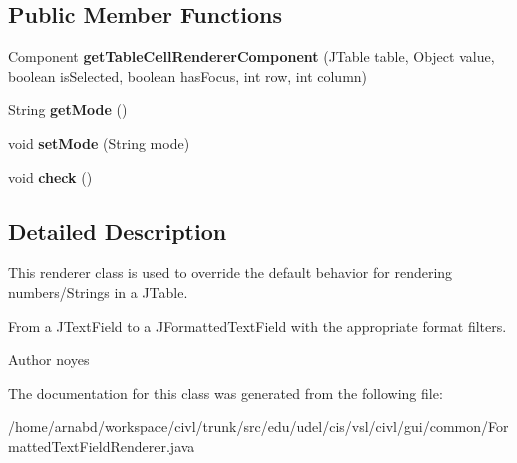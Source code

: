 \subsection*{Public Member Functions}
\begin{DoxyCompactItemize}
\item 
\hypertarget{classedu_1_1udel_1_1cis_1_1vsl_1_1civl_1_1gui_1_1common_1_1FormattedTextFieldRenderer_ac5560693c0e9d5207a85b484b7c58e6e}{}Component {\bfseries get\+Table\+Cell\+Renderer\+Component} (J\+Table table, Object value, boolean is\+Selected, boolean has\+Focus, int row, int column)\label{classedu_1_1udel_1_1cis_1_1vsl_1_1civl_1_1gui_1_1common_1_1FormattedTextFieldRenderer_ac5560693c0e9d5207a85b484b7c58e6e}

\item 
\hypertarget{classedu_1_1udel_1_1cis_1_1vsl_1_1civl_1_1gui_1_1common_1_1FormattedTextFieldRenderer_ace57b57d7a67d6fccccc591a3b1fa9c4}{}String {\bfseries get\+Mode} ()\label{classedu_1_1udel_1_1cis_1_1vsl_1_1civl_1_1gui_1_1common_1_1FormattedTextFieldRenderer_ace57b57d7a67d6fccccc591a3b1fa9c4}

\item 
\hypertarget{classedu_1_1udel_1_1cis_1_1vsl_1_1civl_1_1gui_1_1common_1_1FormattedTextFieldRenderer_ab9ff109f55d030a511eff7c791db6dfb}{}void {\bfseries set\+Mode} (String mode)\label{classedu_1_1udel_1_1cis_1_1vsl_1_1civl_1_1gui_1_1common_1_1FormattedTextFieldRenderer_ab9ff109f55d030a511eff7c791db6dfb}

\item 
\hypertarget{classedu_1_1udel_1_1cis_1_1vsl_1_1civl_1_1gui_1_1common_1_1FormattedTextFieldRenderer_af37cc288f49500013182d027585c6df2}{}void {\bfseries check} ()\label{classedu_1_1udel_1_1cis_1_1vsl_1_1civl_1_1gui_1_1common_1_1FormattedTextFieldRenderer_af37cc288f49500013182d027585c6df2}

\end{DoxyCompactItemize}


\subsection{Detailed Description}
This renderer class is used to override the default behavior for rendering numbers/\+Strings in a J\+Table. 

From a {\ttfamily J\+Text\+Field} to a {\ttfamily J\+Formatted\+Text\+Field} with the appropriate format filters.

\begin{DoxyAuthor}{Author}
noyes 
\end{DoxyAuthor}


The documentation for this class was generated from the following file\+:\begin{DoxyCompactItemize}
\item 
/home/arnabd/workspace/civl/trunk/src/edu/udel/cis/vsl/civl/gui/common/Formatted\+Text\+Field\+Renderer.\+java\end{DoxyCompactItemize}
